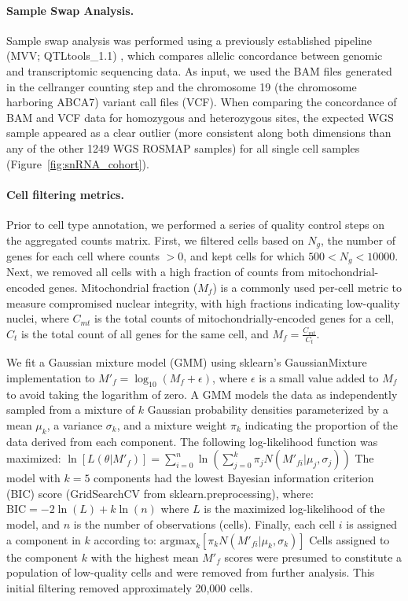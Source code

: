 \paragraph{Sample Swap Analysis.}
Sample swap analysis was performed using a previously established pipeline (MVV; QTLtools\_1.1) \cite{Fort2017-ur}, which compares allelic concordance between genomic and transcriptomic sequencing data. As input, we used the BAM files generated in the cellranger counting step and the chromosome 19 (the chromosome harboring ABCA7) variant call files (VCF). When comparing the concordance of BAM and VCF data for homozygous and heterozygous sites, the expected WGS sample appeared as a clear outlier (more consistent along both dimensions than any of the other 1249 WGS ROSMAP samples) for all single cell samples (Figure~\ref{fig:snRNA_cohort}).


\paragraph{Cell filtering metrics.}
Prior to cell type annotation, we performed a series of quality control steps on the aggregated counts matrix. First, we filtered cells based on $N_g$, the number of genes for each cell where counts $>0$, and kept cells for which $500 < N_g < 10000$. Next, we removed all cells with a high fraction of counts from mitochondrial-encoded genes. Mitochondrial fraction ($M_f$) is a commonly used per-cell metric to measure compromised nuclear integrity, with high fractions indicating low-quality nuclei, where $C_{mt}$ is the total counts of mitochondrially-encoded genes for a cell, $C_t$ is the total count of all genes for the same cell, and $M_f = \frac{C_{mt}}{C_t}$.

We fit a Gaussian mixture model (GMM) using sklearn's GaussianMixture implementation to $M'_f = \log_{10}(M_f + \epsilon)$, where $\epsilon$ is a small value added to $M_f$ to avoid taking the logarithm of zero. A GMM models the data as independently sampled from a mixture of $k$ Gaussian probability densities parameterized by a mean $\mu_k$, a variance $\sigma_k$, and a mixture weight $\pi_k$ indicating the proportion of the data derived from each component. The following log-likelihood function was maximized:
$ \ln[L(\theta|M'_f)] = \sum_{i=0}^{n} \ln \left( \sum_{j=0}^{k} \pi_j N(M'_{fi}|\mu_j, \sigma_j) \right) $
The model with $k = 5$ components had the lowest Bayesian information criterion (BIC) score (GridSearchCV from sklearn.preprocessing), where:
$ \text{BIC} = -2 \ln(L) + k \ln(n) $
where $L$ is the maximized log-likelihood of the model, and $n$ is the number of observations (cells). Finally, each cell $i$ is assigned a component in $k$ according to:
$ \text{argmax}_k \left[ \pi_k N(M'_{fi}|\mu_k, \sigma_k) \right] $
Cells assigned to the component $k$ with the highest mean $M'_f$ scores were presumed to constitute a population of low-quality cells and were removed from further analysis. This initial filtering removed approximately 20,000 cells.

